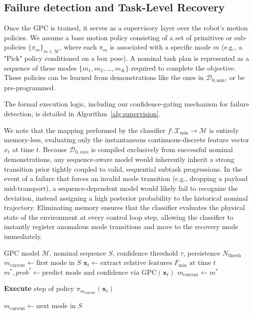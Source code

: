 \documentclass[journal]{IEEEtran}
\begin{document}
\subsection{Failure detection and Task-Level Recovery}
Once the GPC is trained, it serves as a supervisory layer over the robot's motion policies. We assume a base motion policy consisting of a set of primitives or sub-policies $\{\pi_m\}_{m \in \mathcal{M}}$, where each $\pi_m$ is associated with a specific mode $m$ (e.g., a "Pick" policy conditioned on a box pose). A nominal task plan is represented as a sequence of these modes $\{m_1, m_2, \dots, m_K\}$ required to complete the objective. These policies can be learned from demonstrations like the ones in $\mathcal{D}_{0,\text{min}}$, or be pre-programmed.

 The formal execution logic, including our confidence-gating mechanism for failure detection, is detailed in Algorithm~\ref{alg:supervision}.

We note that the mapping performed by the classifier $f: \mathcal{X}_{\text{min}} \rightarrow \mathcal{M}$ is entirely memory-less, evaluating only the instantaneous continuous-discrete feature vector $x_t$ at time $t$. Because $\mathcal{D}_{0,min}$ is compiled exclusively from successful nominal demonstrations, any sequence-aware model would inherently inherit a strong transition prior tightly coupled to valid, sequential subtask progressions. In the event of a failure that forces an invalid mode transition (e.g., dropping a payload mid-transport), a sequence-dependent model would likely fail to recognize the deviation, instead assigning a high posterior probability to the historical nominal trajectory. Eliminating memory ensures that the classifier evaluates the physical state of the environment  at every control loop step, allowing the classifier to instantly register anomalous mode transitions and move to the recovery mode immediately. 
\begin{algorithm}
\caption{Confidence-Gated Mode Supervision}\label{alg:supervision}
\Require GPC model $\mathcal{M}$, nominal sequence $S$, confidence threshold $\tau$, persistence $N_{\text{thresh}}$
\State $m_{\text{current}} \gets \text{first mode in } S$
\State $\mathbf{x}_t \gets \text{extract relative features } F_{\text{min}} \text{ at time } t$
\State $m^*, prob^* \gets \text{predict mode and confidence via GPC}(\mathbf{x}_t)$
\State {}
    \State $m_{\text{current}} \gets m^*$ 
\EndIf

\State \textbf{Execute} step of policy $\pi_{m_{\text{current}}}(\mathbf{x}_t)$ 

\State {}
    \State $m_{\text{current}} \gets \text{next mode in } S$
\EndIf
\EndWhile
\end{algorithm}
\end{document}
